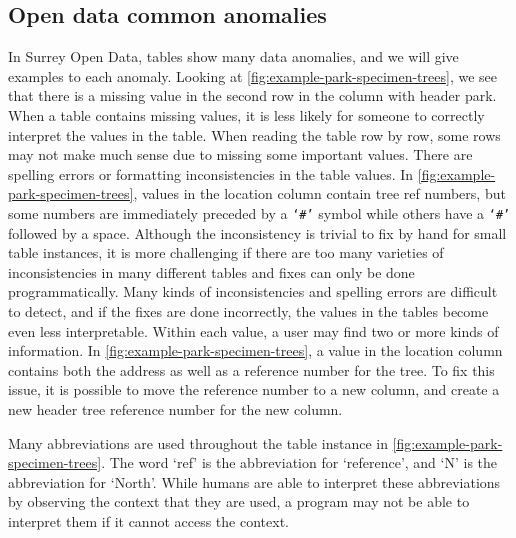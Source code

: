 \subsection{Open data common anomalies}
In Surrey Open Data, tables show many data anomalies, and we will give examples to each anomaly. Looking at \autoref{fig:example-park-specimen-trees}, we see that there is a missing value in the second row in the column with header park. When a table contains missing values, it is less likely for someone to correctly interpret the values in the table. When reading the table row by row, some rows may not make much sense due to missing some important values.
There are spelling errors or formatting inconsistencies in the table values. In \autoref{fig:example-park-specimen-trees}, values in the location column contain tree ref numbers, but some numbers are immediately preceded by a \verb+‘#’+ symbol while others have a \verb+‘#’+ followed by a space. Although the inconsistency is trivial to fix by hand for small table instances, it is more challenging if there are too many varieties of inconsistencies in many different tables and fixes can only be done programmatically. Many kinds of inconsistencies and spelling errors are difficult to detect, and if the fixes are done incorrectly, the values in the tables become even less interpretable.
Within each value, a user may find two or more kinds of information. In \autoref{fig:example-park-specimen-trees}, a value in the location column contains both the address as well as a reference number for the tree. To fix this issue, it is possible to move the reference number to a new column, and create a new header tree reference number for the new column.

Many abbreviations are used throughout the table instance in \autoref{fig:example-park-specimen-trees}. The word ‘ref’ is the abbreviation for ‘reference’, and ‘N’ is the abbreviation for ‘North’. While humans are able to interpret these abbreviations by observing the context that they are used, a program may not be able to interpret them if it cannot access the context.

